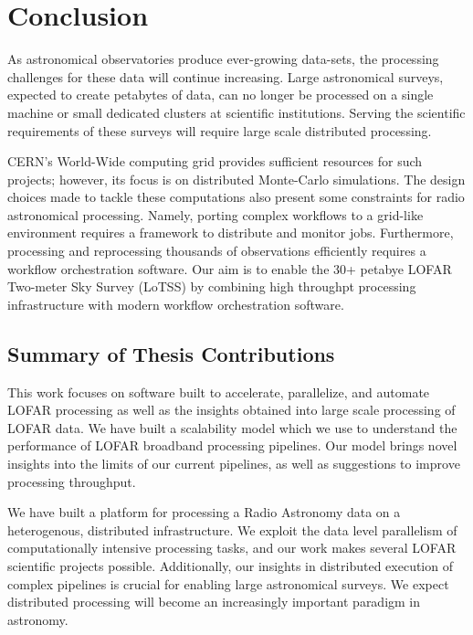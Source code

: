 \chapter{Conclusion}\label{ch:conclusions}


As astronomical observatories produce ever-growing data-sets, the processing challenges for these data will continue increasing. Large astronomical surveys,  expected to create petabytes of data, can no longer be processed on a single machine or small dedicated clusters at scientific institutions.  Serving the scientific requirements of these surveys will require large scale distributed processing. 

CERN's World-Wide computing grid provides sufficient resources for such projects; however, its focus is on distributed Monte-Carlo simulations. The design choices made to tackle these computations also present some constraints for radio astronomical processing. Namely, porting complex workflows to a grid-like environment requires a framework to distribute and monitor jobs. Furthermore, processing and reprocessing thousands of observations efficiently requires a workflow orchestration software. Our aim is to enable the 30+ petabye LOFAR Two-meter Sky Survey (\Gls{LoTSS}) by combining high throughpt processing infrastructure with modern workflow orchestration software. 

\section{Summary of Thesis Contributions}

This work focuses on software built to accelerate, parallelize, and automate LOFAR processing as well as the insights obtained into large scale processing of LOFAR data.  We have built a scalability model which  we use to understand the performance of LOFAR broadband processing pipelines. Our model  brings novel insights into the limits of our current pipelines, as well as suggestions to improve processing throughput. 

We have built a platform for processing a Radio Astronomy data on a heterogenous, distributed infrastructure. We exploit the data level parallelism of computationally intensive processing tasks, and our work makes several LOFAR scientific projects possible. Additionally, our insights in distributed  execution of complex pipelines is crucial for enabling large astronomical surveys. We expect distributed processing will become an increasingly important paradigm in astronomy. 

